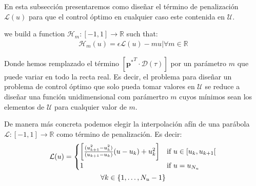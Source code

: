 En esta subsección presentaremos como diseñar el término de penalización $\mathcal{L}(u)$ para que el control óptimo en cualquier caso este contenida en $\mathcal{U}$. 

\begin{definition}
    we build a function $\mathcal{H}_m: [-1,1] \rightarrow \mathbb{R}$ such that:
    \begin{gather}
        \mathcal{H}_m(u) = \epsilon \mathcal{L}(u) - mu  |  \forall m \in \mathbb{R}
    \end{gather}
\end{definition}

Donde hemos remplazado el término $[{\bm{p}^*}^T \cdot \bm{\mathcal{D}}(\tau)]$ por un parámetro $m$ que puede variar en todo la recta real. Es decir, el problema para diseñar un problema de control óptimo que solo pueda tomar valores en $\mathcal{U}$ se reduce a diseñar una función unidimensional  com parámertro $m$ cuyos mínimos sean los elementos de $\mathcal{U}$ para cualquier valor de $m$. 

%
De manera más concreta podemos elegir la interpolación afín de una parábola  $\mathcal{L}:[-1,1] \rightarrow \mathbb{R}$ como término de penalización. Es decir: 
\begin{gather}\label{PLP}
    {\mathcal{L}(u)} = \begin{cases}
        \bigg[ \frac{(u_{k+1}^2-u_{k}^2)}{(u_{k+1}-u_{k})} (u-u_k) + u_k^2 \bigg] & \text{if}  u \in [u_k,u_{k+1}[ \\
        1 & \text{if} \ u = u_{N_u} 
    \end{cases} \\
    \notag \forall k \in \{1,\dots,N_u-1\}
\end{gather}

